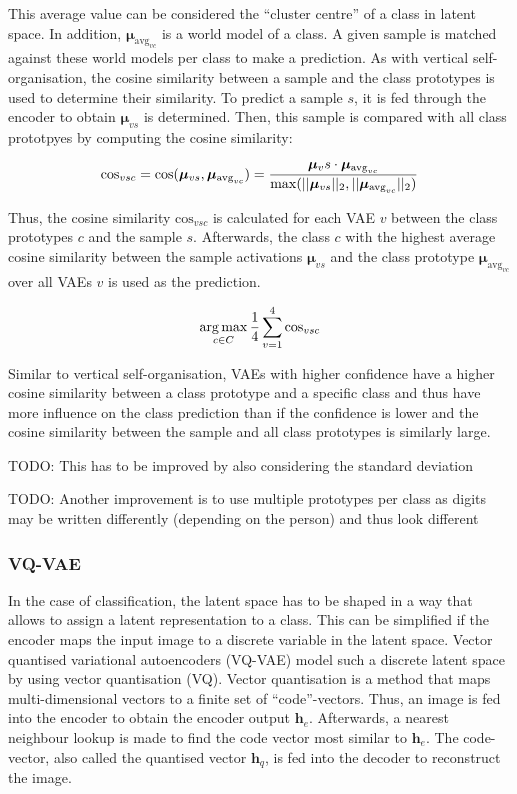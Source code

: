 This average value can be considered the ``cluster centre'' of a class in latent space. In addition, $\boldsymbol{\mu}_{\text{avg}_{vc}}$ is a world model of a class. A given sample is matched against these world models per class to make a prediction. As with vertical self-organisation, the cosine similarity between a sample and the class prototypes is used to determine their similarity. To predict a sample $s$, it is fed through the encoder to obtain $\boldsymbol{\mu}_{vs}$ is determined. Then, this sample is compared with all class prototpyes by computing the cosine similarity: 

\begin{equation}\eqlbl{hso_13}
		\text{cos}_{vsc} = \text{cos}(\boldsymbol{\mu}_{vs}, \boldsymbol{\mu}_{\text{avg}_{vc}}) = \frac{\boldsymbol{\mu}_vs \cdot \boldsymbol{\mu}_{\text{avg}_{vc}}}{\max(||\boldsymbol{\mu}_{vs}||_2, ||\boldsymbol{\mu}_{\text{avg}_{vc}}||_2)}
\end{equation}

Thus, the cosine similarity $\text{cos}_{vsc}$ is calculated for each VAE $v$ between the class prototypes $c$ and the sample $s$.
Afterwards, the class $c$ with the highest average cosine similarity between the sample activations $\boldsymbol{\mu}_{vs}$ and the class prototype $\boldsymbol{\mu}_{\text{avg}_{vc}}$ over all VAEs $v$ is used as the prediction.

\begin{equation}\eqlbl{hso_14}
		\argmax_{c \in C} \frac{1}{4} \sum_{v=1}^{4} \text{cos}_{vsc}
\end{equation}

Similar to vertical self-organisation, VAEs with higher confidence have a higher cosine similarity between a class prototype and a specific class and thus have more influence on the class prediction than if the confidence is lower and the cosine similarity between the sample and all class prototypes is similarly large.

TODO: This has to be improved by also considering the standard deviation


TODO: Another improvement is to use multiple prototypes per class as digits may be written differently (depending on the person) and thus look different


\subsubsection{VQ-VAE}
In the case of classification, the latent space has to be shaped in a way that allows to assign a latent representation to a class.
This can be simplified if the encoder maps the input image to a discrete variable in the latent space.
Vector quantised variational autoencoders (VQ-VAE)  model such a discrete latent space by using vector quantisation (VQ).
Vector quantisation is a method that maps multi-dimensional vectors to a finite set of ``code''-vectors.
Thus, an image is fed into the encoder to obtain the encoder output $\boldsymbol{h}_e$.
Afterwards, a nearest neighbour lookup is made to find the code vector most similar to $\boldsymbol{h}_e$.
The code-vector, also called the quantised vector $\boldsymbol{h}_q$, is fed into the decoder to reconstruct the image.


